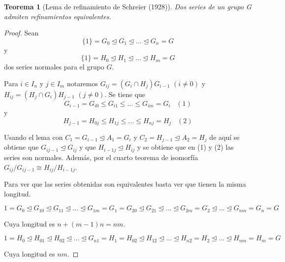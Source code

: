 \documentclass{article}
\theoremstyle{theorem-style}  %
\newtheorem{theorem}{Teorema}[section]  %
\theoremstyle{definition-style}
\theoremstyle{example-style}
\begin{document}
\begin{theorem}[Lema de refinamiento de Schreier (1928)]
Dos series de un grupo G admiten refinamientos equivalentes.
\end{theorem}
\begin{proof}
Sean $$\{1\} = G_0 \trianglelefteq G_1 \trianglelefteq ... \trianglelefteq G_n = G$$ y $$\{1\} = H_0 \trianglelefteq H_1 \trianglelefteq ... \trianglelefteq H_m = G$$ dos series normales para el grupo $G$. 

Para $i \in I_n$ y $j \in I_m$ notaremos $G_{ij} = (G_i \cap H_j)G_{i-1}$ $(i \neq 0)$ y $H_{ij} = (H_{j} \cap G_i) H_{j-1}$ $(j \neq 0)$. Se tiene que $$G_{i-1} = G_{i0} \le G_{i1} \le ... \le G_{im} = G_i \;\;\; (1)$$ y $$H_{j-1} = H_{0j} \le H_{1j} \le ... \le H_{nj} = H_j \;\;\; (2)$$

Usando el lema con $C_1 = G_{i-1} \trianglelefteq A_1 = G_i$ y $C_2 = H_{j-1} \trianglelefteq A_2 = H_j$ de aquí se obtiene que $G_{ij-1} \trianglelefteq G_{ij}$ y que $H_{i-1j} \trianglelefteq H_{ij}$ y se obtiene que en (1) y (2) las series son normales. Además, por el cuarto teorema de isomorfía $G_{ij}/G_{ij-1} \cong H_{ij}/H_{i-1j}$.

Para ver que las series obtenidas son equivalentes basta ver que tienen la misma longitud. 

$1 = G_0 \trianglelefteq G_{10} \trianglelefteq G_{11} \trianglelefteq ... \trianglelefteq G_{1m} = G_1 = G_{20} \trianglelefteq G_{21} \trianglelefteq ... \trianglelefteq G_{2m} = G_2 \trianglelefteq ... \trianglelefteq G_{nm} = G_n = G$

Cuya longitud es $n+(m-1)n = nm$.

$1 = H_0 \trianglelefteq H_{01} \trianglelefteq H_{02} \trianglelefteq ... \trianglelefteq G_{n1} = H_1 = H_{02} \trianglelefteq H_{12} \trianglelefteq ... \trianglelefteq H_{n2} = H_2 \trianglelefteq ... \trianglelefteq H_{nm} = H_m = G$

Cuya longitud es $nm$.
\end{proof}
\end{document}
